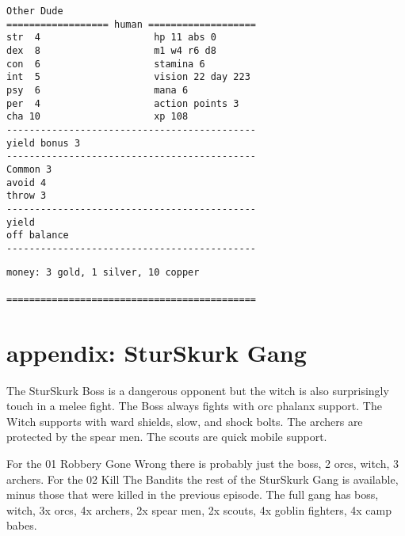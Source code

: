 \begin{verbatim}
\end{verbatim} \pagebreak[2] \begin{verbatim}
Other Dude
================== human ===================
str  4                    hp 11 abs 0
dex  8                    m1 w4 r6 d8
con  6                    stamina 6
int  5                    vision 22 day 223
psy  6                    mana 6
per  4                    action points 3
cha 10                    xp 108
--------------------------------------------
yield bonus 3
--------------------------------------------
Common 3
avoid 4
throw 3
--------------------------------------------
yield
off balance
--------------------------------------------
\end{verbatim} \goodbreak \begin{verbatim}
money: 3 gold, 1 silver, 10 copper

============================================

\end{verbatim}
\normalsize


























\newpage
\section*{appendix: SturSkurk Gang}

The SturSkurk Boss is a dangerous opponent but the witch is also surprisingly touch in a melee fight. The Boss always fights with orc phalanx support. The Witch supports with ward shields, slow, and shock bolts. The archers are protected by the spear men. The scouts are quick mobile support.

For the 01 Robbery Gone Wrong there is probably just the boss, 2 orcs, witch, 3 archers. For the 02 Kill The Bandits the rest of the SturSkurk Gang is available, minus those that were killed in the previous episode. The full gang has boss, witch, 3x orcs, 4x archers, 2x spear men, 2x scouts, 4x goblin fighters, 4x camp babes.


